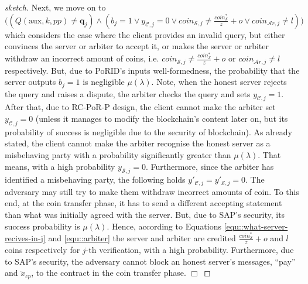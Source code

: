 \begin{proof}[sketch]
Next, we move on to  $\Big((Q(\text{aux},k,{pp})\neq \bm{q}_{\scriptscriptstyle j}) \wedge  (b_{\scriptscriptstyle j}=1 \vee  y_{\scriptscriptstyle\mathcal{C},j}=0  \vee  coin_{\scriptscriptstyle\mathcal{S},j}\neq \frac{coin_{\scriptscriptstyle\mathcal S}^{\scriptscriptstyle*}}{z}+o  \vee  coin_{\scriptscriptstyle\mathcal{A}r,j}\neq l )\Big)$    which considers the case where the client provides an invalid query, but  either convinces the server or arbiter to accept it, or  makes the server or arbiter  withdraw an incorrect amount of coins, i.e. $coin_{\scriptscriptstyle\mathcal{S},j}\neq \frac{coin_{\scriptscriptstyle\mathcal S}^{\scriptscriptstyle*}}{z}+o$ or  $coin_{\scriptscriptstyle\mathcal{A}r,j}\neq l$ respectively. But, due to PoRID's inputs well-formedness, the probability that the server outputs $b_{\scriptscriptstyle j}=1$ is negligible $\mu(\lambda)$. Note, when the honest server rejects the query and raises a dispute, the arbiter checks the query and sets $y_{\scriptscriptstyle\mathcal{C},j}=1$. After that, due to  RC-PoR-P design, the client cannot make the arbiter set $y_{\scriptscriptstyle\mathcal{C},j}=0$ (unless it manages to modify the blockchain's content later on, but its probability of success is negligible due to the security of blockchain).  As already stated, the client cannot make the arbiter recognise the  honest server as a misbehaving party with a probability significantly greater than $\mu(\lambda)$. That means, with a high probability $y_{\scriptscriptstyle\mathcal{S},j}=0$. Furthermore, since the arbiter  has identified a misbehaving party, the following holds   $y'_{\scriptscriptstyle\mathcal{C},j}=y'_{\scriptscriptstyle\mathcal{S},j}=0$.  The adversary may still try to  make them withdraw  incorrect amounts of coin. To this end, at the coin transfer phase, it has to send a  different accepting statement  than what was initially agreed with the server. But, due to SAP's  security, its  success probability is  $\mu(\lambda)$.  Hence, according to Equations \ref{equ::what-server-recives-in-j} and \ref{equ::arbiter} the server and arbiter are credited $\frac{coin_{\scriptscriptstyle\mathcal S}^{\scriptscriptstyle*}}{z}+o$ and $l$ coins respectively for $j$-th verification, with a high probability.  Furthermore, due to SAP's  security, the adversary cannot block an honest server's  messages, ``pay'' and $\ddot{x}_{\scriptscriptstyle cp}$, to the contract in the coin transfer phase. \hfill\(\Box\)\end{proof}
  
 

